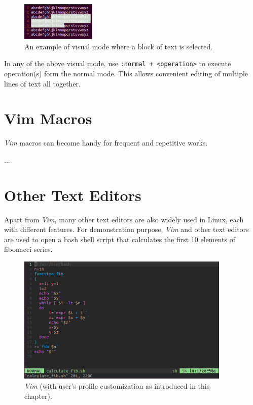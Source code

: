 \begin{figure}
	\centering
	\includegraphics[width=100pt]{chapters/ch_text_file_editing/figures/vimvm1.png}
	\caption{An example of visual mode where a block of text is selected.} \label{ch3fig:vimvm1}
\end{figure}

In any of the above visual mode, use \verb|:normal + <operation>| to execute operation(s) form the normal mode. This allows convenient editing of multiple lines of text all together.

\section{Vim Macros}

\textit{Vim} macros can become handy for frequent and repetitive works.

...

\section{Other Text Editors}

Apart from \textit{Vim}, many other text editors are also widely used in Linux, each with different features. For demonstration purpose, \textit{Vim} and other text editors are used to open a bash shell script that calculates the first 10 elements of fibonacci series.

\begin{figure}
	\centering
	\includegraphics[width=4in]{chapters/ch_text_file_editing/figures/vim_fib.png}
	\caption{\textit{Vim} (with user's profile customization as introduced in this chapter).}
\end{figure}

